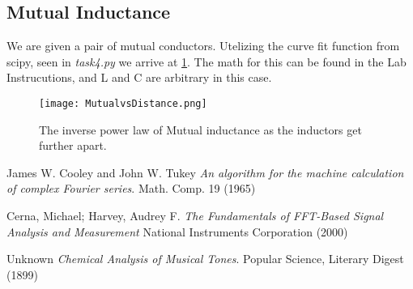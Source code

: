 \documentclass{article}
\begin{document}
\subsection{Mutual Inductance}
We are given a pair of  mutual conductors. Utelizing the curve fit function from scipy, seen in \textit{task4.py} we arrive at \ref{mut}. The math for this can be found in the Lab Instrucutions, and L and C are arbitrary in this case.
\begin{figure}[h]
  \centering
  \texttt{[image: MutualvsDistance.png]}
  \caption[scale=0.5]{The inverse power law of Mutual inductance as the inductors get further apart.}
  \label{mut}
\end{figure}

\begin{thebibliography}{9}
James W. Cooley and John W. Tukey
\textit{An algorithm for the machine calculation of complex Fourier series}.
Math. Comp. 19 (1965)

Cerna, Michael; Harvey, Audrey F.
\textit{The Fundamentals of FFT-Based Signal Analysis and Measurement}
National Instruments Corporation (2000)


Unknown
\textit{Chemical Analysis of Musical Tones}.
Popular Science, Literary Digest (1899)

\end{thebibliography}
\end{document}
